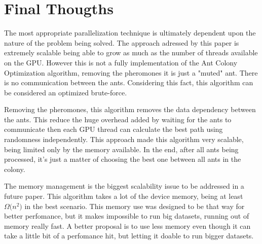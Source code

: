 \section{Final Thougths}

The most appropriate parallelization technique is ultimately dependent upon the
nature of the problem being solved. The approach adressed by this paper
is extremely scalable being able to grow as much as the number of threads available on the GPU.
However this is not a fully implementation of the Ant Colony Optimization algorithm,
removing the pheromones it is just a "muted" ant. There is no communication between the ants.
Considering this fact, this algorithm can be considered an optimized brute-force.

Removing the pheromones, this algorithm removes the data dependency between the ants.
This reduce the huge overhead added by waiting for the ants to communicate then each GPU
thread can calculate the best path using randomness independently. This approach made this algorithm
very scalable, being limited only by the memory available. In the end, after all ants
being processed, it's just a matter of choosing the best one between all ants in the colony.

The memory management is the biggest scalability issue to be addressed in a future paper. This algorithm
takes a lot of the device memory, being at least $\Omega({n^{2})}$ in the best scenario.
This memory use was designed to be that way for better perfomance, but it makes impossible to run big datasets, running out
of memory really fast. A better proposal is to use less memory even though it can take a little bit of a perfomance hit, but
letting it doable to run bigger datasets.
